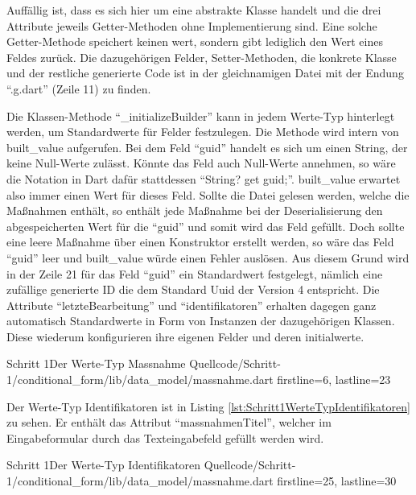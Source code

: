 Auffällig ist, dass es sich hier um eine abstrakte Klasse handelt und die drei Attribute jeweils Getter-Methoden ohne Implementierung sind. Eine solche Getter-Methode speichert keinen wert, sondern gibt lediglich den Wert eines Feldes zurück. Die dazugehörigen Felder,  Setter-Methoden, die konkrete Klasse und der restliche generierte Code ist in der gleichnamigen Datei mit der Endung \enquote{.g.dart} (Zeile 11) zu finden.

Die Klassen-Methode \enquote{_initializeBuilder} kann in jedem Werte-Typ hinterlegt werden, um Standardwerte für Felder festzulegen.
Die Methode wird intern von built_value aufgerufen. Bei dem Feld \enquote{guid} handelt es sich um einen String, der keine Null-Werte zulässt. Könnte das Feld auch Null-Werte annehmen, so wäre die Notation in Dart dafür stattdessen \enquote{String? get guid;}. built_value erwartet also immer einen Wert für dieses Feld. Sollte die Datei gelesen werden, welche die Maßnahmen enthält, so enthält jede Maßnahme bei der Deserialisierung den abgespeicherten Wert für die \enquote{guid} und somit wird das Feld gefüllt. Doch sollte eine leere Maßnahme über einen Konstruktor erstellt werden, so wäre das Feld \enquote{guid} leer und built_value würde einen Fehler auslösen. Aus diesem Grund wird in der Zeile 21 für das Feld \enquote{guid} ein Standardwert festgelegt, nämlich eine zufällige  generierte ID die dem Standard Uuid der Version 4 entspricht.
Die Attribute \enquote{letzteBearbeitung} und \enquote{identifikatoren} erhalten dagegen ganz automatisch Standardwerte in Form von Instanzen der dazugehörigen Klassen. Diese wiederum konfigurieren ihre eigenen Felder und deren initialwerte.

\begin{alexlisting}{Schritt 1}{Der Werte-Typ Massnahme}
  {Quellcode/Schritt-1/conditional_form/lib/data_model/massnahme.dart}
  {firstline=6, lastline=23}
  \label{lst:Schritt1WerteTypMassnahme}
\end{alexlisting}

Der Werte-Typ Identifikatoren ist in Listing \ref{lst:Schritt1WerteTypIdentifikatoren} zu sehen.  Er enthält das Attribut \enquote{massnahmenTitel}, welcher im Eingabeformular durch das Texteingabefeld gefüllt werden wird.

\begin{alexlisting}{Schritt 1}{Der Werte-Typ Identifikatoren}
  {Quellcode/Schritt-1/conditional_form/lib/data_model/massnahme.dart}
  {firstline=25, lastline=30}
  \label{lst:Schritt1WerteTypIdentifikatoren}
\end{alexlisting}

